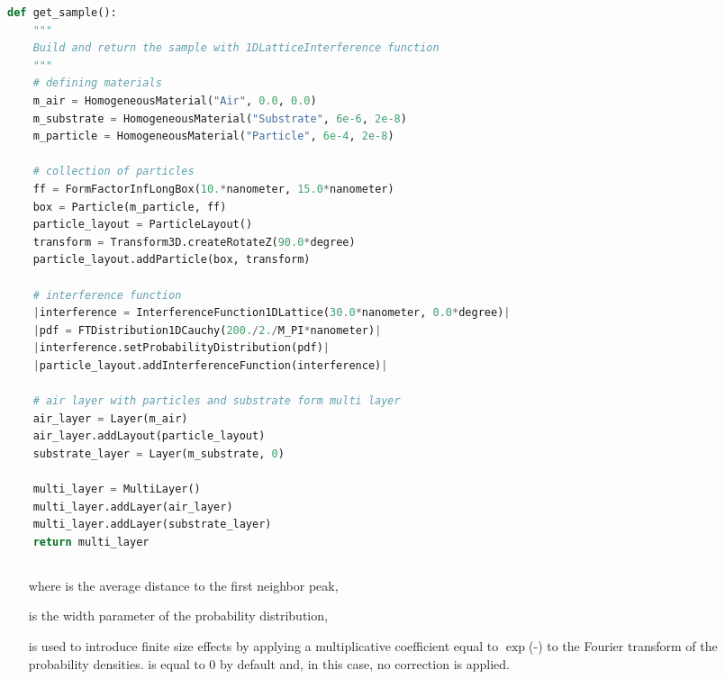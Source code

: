\newpage
\begin{lstlisting}[language=python, style=eclipseboxed,numbers=none,nolol,caption={\Code{Python} script to generate a sample made of infinitely long boxes deposited on a substrate layer with the 1DLatticeInterference function. The part specific to the interferences is marked in a red italic font.},label={lst:1dlattinterf}]
def get_sample():
    """
    Build and return the sample with 1DLatticeInterference function
    """
    # defining materials
    m_air = HomogeneousMaterial("Air", 0.0, 0.0)
    m_substrate = HomogeneousMaterial("Substrate", 6e-6, 2e-8)
    m_particle = HomogeneousMaterial("Particle", 6e-4, 2e-8)

    # collection of particles
    ff = FormFactorInfLongBox(10.*nanometer, 15.0*nanometer)
    box = Particle(m_particle, ff)
    particle_layout = ParticleLayout()
    transform = Transform3D.createRotateZ(90.0*degree)
    particle_layout.addParticle(box, transform)

    # interference function
    |interference = InterferenceFunction1DLattice(30.0*nanometer, 0.0*degree)|
    |pdf = FTDistribution1DCauchy(200./2./M_PI*nanometer)|
    |interference.setProbabilityDistribution(pdf)|
    |particle_layout.addInterferenceFunction(interference)|

    # air layer with particles and substrate form multi layer
    air_layer = Layer(m_air)
    air_layer.addLayout(particle_layout)
    substrate_layer = Layer(m_substrate, 0)

    multi_layer = MultiLayer()
    multi_layer.addLayer(air_layer)
    multi_layer.addLayer(substrate_layer)
    return multi_layer
\end{lstlisting}

\newpage
\subsection{}
\begin{itemize}
\item[where]  is the average distance to the first neighbor peak,
\item[] is the width parameter of the probability distribution,
\item[]  is used to introduce finite size effects by applying a multiplicative coefficient equal to  $\exp$(-) to the Fourier transform of the probability densities.  is equal to 0 by default and, in this case, no correction is applied.
\end{itemize}

